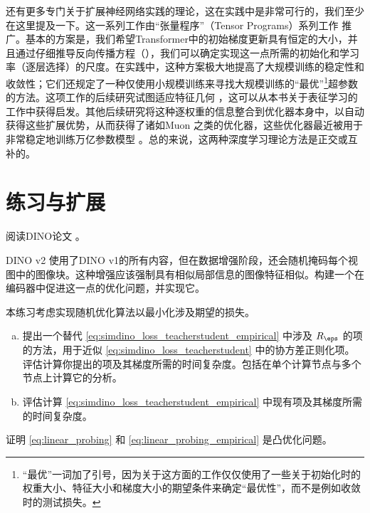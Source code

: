 \documentclass[../../book-main_zh.tex]{subfiles}
\begin{document}
还有更多专门关于扩展神经网络实践的理论，这在实践中是非常可行的，我们至少在这里提及一下。这一系列工作由“张量程序”（Tensor Programs）系列工作 \citep{yang2022tensor} 推广。基本的方案是，我们希望Transformer中的初始梯度更新具有恒定的大小，并且通过仔细推导反向传播方程（），我们可以确定实现这一点所需的初始化和学习率（逐层选择）的尺度。在实践中，这种方案极大地提高了大规模训练的稳定性和收敛性；它们还规定了一种仅使用小规模训练来寻找大规模训练的“最优”\footnote{“最优”一词加了引号，因为关于这方面的工作仅仅使用了一些关于初始化时的权重大小、特征大小和梯度大小的期望条件来确定“最优性”，而不是例如收敛时的测试损失。}超参数的方法。这项工作的后续研究试图适应特征几何 \citep{bernstein2024oldoptimizernewnorm}，这可以从本书关于表征学习的工作中获得启发。其他后续研究将这种逐权重的信息整合到优化器本身中，以自动获得这些扩展优势，从而获得了诸如Muon \citep{jordan6muon} 之类的优化器，这些优化器最近被用于非常稳定地训练万亿参数模型 \citep{moonshot2025kimi}。总的来说，这两种深度学习理论方法是正交或互补的。

\section{练习与扩展}

\begin{exercise}
阅读DINO论文 \cite{caron2021emerging}。
\end{exercise}

\begin{exercise}
DINO v2 \cite{oquab2023dinov2} 使用了DINO v1的所有内容，但在数据增强阶段，还会随机掩码每个视图中的图像块。这种增强应该强制具有相似局部信息的图像特征相似。构建一个在编码器中促进这一点的优化问题，并实现它。
\end{exercise}

\begin{exercise}
本练习考虑实现随机优化算法以最小化涉及期望的损失。
\begin{enumerate}[(a)]
\item 提出一个替代 \eqref{eq:simdino_loss_teacherstudent_empirical} 中涉及 \(R_{\eps}\) 的项的方法，用于近似 \eqref{eq:simdino_loss_teacherstudent} 中的协方差正则化项。评估计算你提出的项及其梯度所需的时间复杂度。包括在单个计算节点与多个节点上计算它的分析。
\item 评估计算 \eqref{eq:simdino_loss_teacherstudent_empirical} 中现有项及其梯度所需的时间复杂度。
\end{enumerate}
\end{exercise}

\begin{exercise}
证明 \eqref{eq:linear_probing} 和 \eqref{eq:linear_probing_empirical} 是凸优化问题。
\end{exercise}
\end{document}

